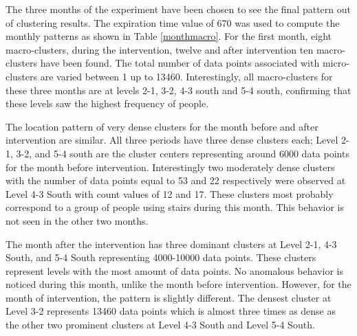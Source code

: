 
The three months of the experiment have been chosen to see the final pattern out of clustering results.
The expiration time value of 670 was used to compute the monthly patterns as shown in Table \ref{monthmacro}. For the first month, eight macro-clusters, during the intervention, twelve and after intervention ten macro-clusters have been found. The total number of data points associated with micro-clusters are varied between 1 up to 13460. Interestingly, all macro-clusters for these three months are at levels 2-1, 3-2, 4-3 south and 5-4 south, confirming that these levels saw the highest frequency of people.
 

The location pattern of very dense clusters for the month before and after intervention are similar. All three periods have three dense clusters each; Level 2-1, 3-2, and 5-4 south are the cluster centers representing around 6000 data points for the month before intervention. Interestingly two moderately dense clusters with the number of data points equal to 53 and 22 respectively were observed at Level 4-3 South with count values of 12 and 17. These clusters most probably correspond to a group of people using stairs during this month. This behavior is not seen in the other two months.

The month after the intervention has three dominant clusters at Level 2-1, 4-3 South, and 5-4 South representing 4000-10000 data points. These clusters represent levels with the most amount of data points. No anomalous behavior is noticed during this month, unlike the month before intervention. However, for the month of intervention, the pattern is slightly different. The densest cluster at Level 3-2 represents 13460 data points which is almost three times as dense as the other two prominent clusters at Level 4-3 South and Level 5-4 South.



